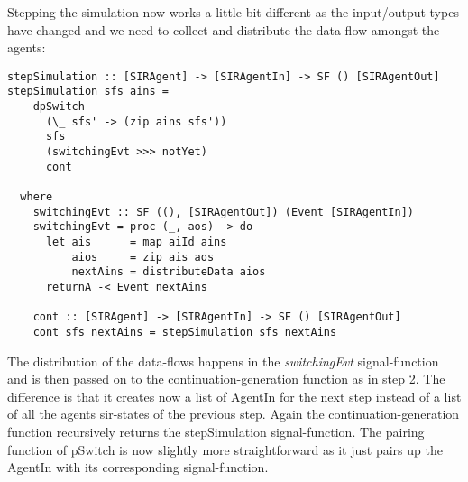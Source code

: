Stepping the simulation now works a little bit different as the input/output types have changed and we need to collect and distribute the data-flow amongst the agents:

\begin{verbatim}
stepSimulation :: [SIRAgent] -> [SIRAgentIn] -> SF () [SIRAgentOut]
stepSimulation sfs ains =
    dpSwitch
      (\_ sfs' -> (zip ains sfs'))
      sfs
      (switchingEvt >>> notYet)
      cont

  where
    switchingEvt :: SF ((), [SIRAgentOut]) (Event [SIRAgentIn])
    switchingEvt = proc (_, aos) -> do
      let ais      = map aiId ains
          aios     = zip ais aos
          nextAins = distributeData aios
      returnA -< Event nextAins

    cont :: [SIRAgent] -> [SIRAgentIn] -> SF () [SIRAgentOut]
    cont sfs nextAins = stepSimulation sfs nextAins
\end{verbatim}

The distribution of the data-flows happens in the \textit{switchingEvt} signal-function and is then passed on to the continuation-generation function as in step 2. The difference is that it creates now a list of AgentIn for the next step instead of a list of all the agents sir-states of the previous step. Again the continuation-generation function recursively returns the stepSimulation signal-function. The pairing function of pSwitch is now slightly more straightforward as it just pairs up the AgentIn with its corresponding signal-function.

